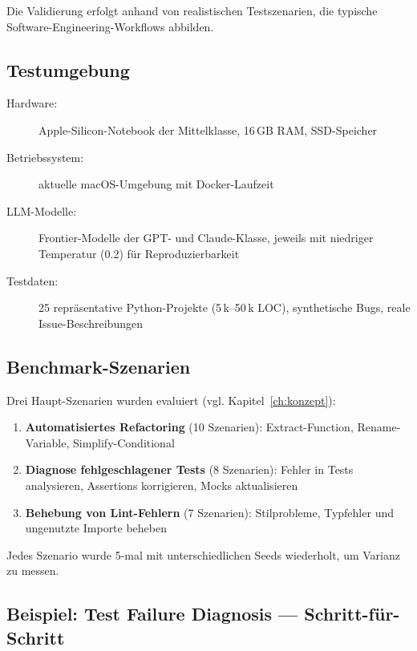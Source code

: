 Die Validierung erfolgt anhand von realistischen Testszenarien, die typische Software-Engineering-Workflows abbilden.

\subsection{Testumgebung}

\begin{sloppypar}
\begin{description}
  \item[Hardware:] Apple-Silicon-Notebook der Mittelklasse, 16\,GB RAM, SSD-Speicher
  \item[Betriebssystem:] aktuelle macOS-Umgebung mit Docker-Laufzeit
  \item[LLM-Modelle:] Frontier-Modelle der GPT- und Claude-Klasse, jeweils mit niedriger Temperatur (0.2) für Reproduzierbarkeit
  \item[Testdaten:] 25 repräsentative Python-Projekte (5\,k--50\,k LOC), synthetische Bugs, reale Issue-Beschreibungen
\end{description}
\end{sloppypar}

\subsection{Benchmark-Szenarien}

Drei Haupt-Szenarien wurden evaluiert (vgl. Kapitel~\ref{ch:konzept}):

\begin{enumerate}
  \item \textbf{Automatisiertes Refactoring} (10 Szenarien): Extract-Function, Rename-Variable, Simplify-Conditional
  \item \textbf{Diagnose fehlgeschlagener Tests} (8 Szenarien): Fehler in Tests analysieren, Assertions korrigieren, Mocks aktualisieren
  \item \textbf{Behebung von Lint-Fehlern} (7 Szenarien): Stilprobleme, Typfehler und ungenutzte Importe beheben
\end{enumerate}

Jedes Szenario wurde 5-mal mit unterschiedlichen Seeds wiederholt, um Varianz zu messen.

\subsection{Beispiel: Test Failure Diagnosis — Schritt-für-Schritt}

